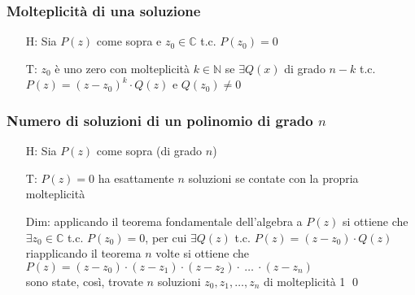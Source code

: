 \documentclass[a4paper]{article}
\begin{document}
\subsubsection*{Molteplicità di una soluzione}
\begin{itemize}
	\item[H: ] Sia \(P(z)\) come sopra e \(z_0 \in \mathbb{C}\) t.c. \(P(z_0) = 0\)
	\item[T: ] \(z_0\) è uno zero con molteplicità \(k \in \mathbb{N}\) se \(\exists Q(x)\) di grado \(n-k\) t.c. \\
	\(P(z) = \left( z - z_0 \right) ^ k \cdot Q(z)\) e \(Q(z_0) \neq 0\)
\end{itemize}

\subsubsection*{Numero di soluzioni di un polinomio di grado \(n\)}
\begin{itemize}
	\item[H: ] Sia \(P(z)\) come sopra (di grado \(n\))
	\item[T: ] \(P(z) = 0\) ha esattamente \(n\) soluzioni se contate con la propria molteplicità
	\item[Dim: ] applicando il teorema fondamentale dell'algebra a \(P(z)\) si ottiene che \\
	\(\exists z_0 \in \mathbb{C}\) t.c. \(P(z_0) = 0\), per cui \(\exists Q(z)\) t.c. \(P(z) = \left( z - z_0 \right) \cdot Q(z)\)\\
	riapplicando il teorema \(n\) volte si ottiene che \\
	\(P(z) = \left( z - z_0 \right) \cdot \left( z - z_1 \right) \cdot \left( z - z_2 \right) \cdot \ \dots \ \cdot \left( z - z_n \right)\) \\
	sono state, così, trovate \(n\) soluzioni \(z_0, z_1, \dots, z_n\) di molteplicità 1 \qed
\end{itemize}
\end{document}
